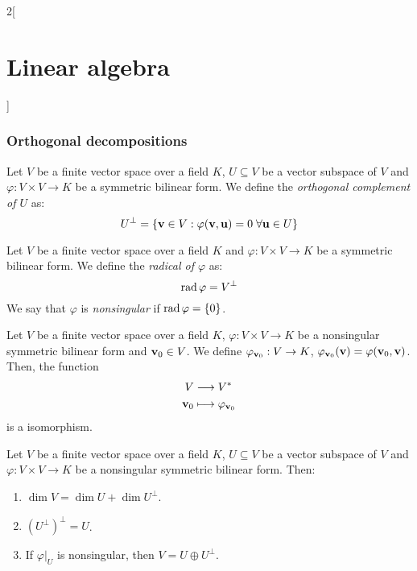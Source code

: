 \documentclass[../../../main.tex]{subfiles}
\begin{document}
\begin{multicols}{2}[\section{Linear algebra}]
  \subsubsection{Orthogonal decompositions}
  \begin{definition}\label{LA_singular}
    Let $V$ be a finite vector space over a field $K$, $U\subseteq V$ be a vector subspace of $V$ and $\varphi:V\times V\rightarrow K$ be a symmetric bilinear form. We define the \textit{orthogonal complement of $U$} as: $$U^\perp=\{\boldsymbol{\mathrm{v}}\in V:\varphi(\boldsymbol{\mathrm{v}},\boldsymbol{\mathrm{u}})=0\;\forall\boldsymbol{\mathrm{u}}\in U\}$$
  \end{definition}
  \begin{definition}
    Let $V$ be a finite vector space over a field $K$ and $\varphi:V\times V\rightarrow K$ be a symmetric bilinear form. We define the \textit{radical of $\varphi$} as: $$\operatorname{rad}\varphi=V^\perp$$ We say that $\varphi$ is \textit{nonsingular} if $\operatorname{rad}\varphi=\{0\}$.
  \end{definition}
  \begin{definition}
    Let $V$ be a finite vector space over a field $K$, $\varphi:V\times V\rightarrow K$ be a nonsingular symmetric bilinear form and $\boldsymbol{\mathrm{v}}_0\in V$. We define $\varphi_{\boldsymbol{\mathrm{v}}_0}:V\rightarrow K$, $\varphi_{\boldsymbol{\mathrm{v}}_0}(\boldsymbol{\mathrm{v}})=\varphi(\boldsymbol{\mathrm{v}}_0,\boldsymbol{\mathrm{v}})$. Then, the function
    \begin{align*}
      V                    & \longrightarrow V^*                       \\
      \boldsymbol{\mathrm{v}}_0 & \longmapsto\varphi_{\boldsymbol{\mathrm{v}}_0}
    \end{align*} is a isomorphism.
  \end{definition}
  \begin{definition}
    Let $V$ be a finite vector space over a field $K$, $U\subseteq V$ be a vector subspace of $V$ and $\varphi:V\times V\rightarrow K$ be a nonsingular symmetric bilinear form. Then:
    \begin{enumerate}
      \item $\dim V=\dim U+\dim U^\perp$.
      \item ${(U^\perp)}^\perp=U$.
      \item If $\varphi|_U$ is nonsingular, then $V=U\oplus U^\perp$.
    \end{enumerate}
  \end{definition}
  \begin{definition}

\end{definition}
\end{multicols}
\end{document}
